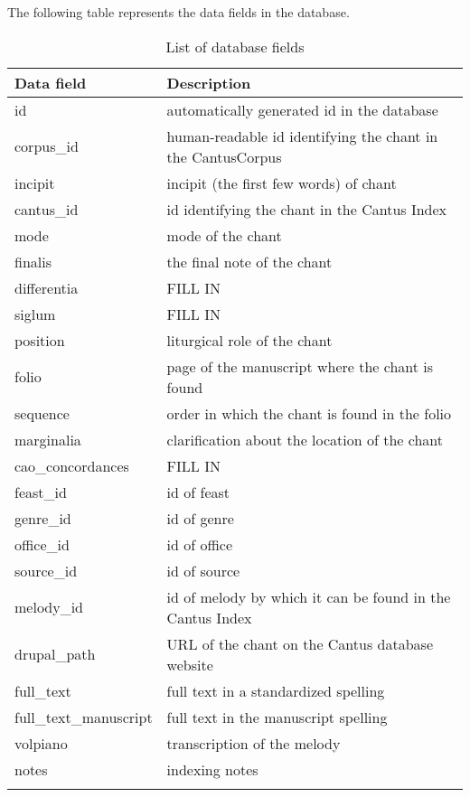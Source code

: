 The following table represents the data fields in the database.

\begin{longtable}{| p{} | p{} |} 

 \hline
 Data field & Description \\
 \hline
 id & automatically generated id in the database \\ \hline
 corpus\_id & human-readable id identifying the chant in the CantusCorpus \\ \hline
 incipit & incipit (the first few words) of chant \\ \hline
 cantus\_id & id identifying the chant in the Cantus Index \\ \hline
 mode & mode of the chant \\ \hline
 finalis & the final note of the chant \\ \hline
 differentia & FILL IN \\ \hline
 siglum & FILL IN \\ \hline
 position & liturgical role of the chant \\ \hline
 folio & page of the manuscript where the chant is found \\ \hline
 sequence & order in which the chant is found in the folio \\ \hline
 marginalia & clarification about the location of the chant \\ \hline
 cao\_concordances & FILL IN \\ \hline
 feast\_id & id of feast \\ \hline
 genre\_id & id of genre \\ \hline
 office\_id & id of office \\ \hline
 source\_id & id of source \\ \hline
 melody\_id & id of melody by which it can be found in the Cantus Index \\ \hline
 drupal\_path & URL of the chant on the Cantus database website \\ \hline
 full\_text & full text in a standardized spelling \\ \hline
 full\_text\_manuscript & full text in the manuscript spelling \\ \hline
 volpiano & transcription of the melody \\ \hline
 notes & indexing notes \\
 \hline

\caption{List of database fields}
\end{longtable}

